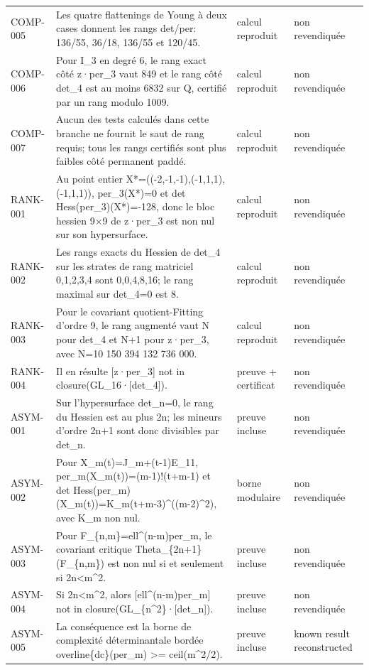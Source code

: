 \begin{longtable}{@{}>{\raggedright\arraybackslash}p{1.6cm}>{\raggedright\arraybackslash}p{8.4cm}>{\raggedright\arraybackslash}p{2.5cm}>{\raggedright\arraybackslash}p{2.0cm}@{}}
COMP-005 & Les quatre flattenings de Young à deux cases donnent les rangs det/per: 136/55, 36/18, 136/55 et 120/45. & calcul reproduit & non revendiquée \\
COMP-006 & Pour I\_3 en degré 6, le rang exact côté z·per\_3 vaut 849 et le rang côté det\_4 est au moins 6832 sur Q, certifié par un rang modulo 1009. & calcul reproduit & non revendiquée \\
COMP-007 & Aucun des tests calculés dans cette branche ne fournit le saut de rang requis; tous les rangs certifiés sont plus faibles côté permanent paddé. & calcul reproduit & non revendiquée \\
RANK-001 & Au point entier X*=((-2,-1,-1),(-1,1,1),(-1,1,1)), per\_3(X*)=0 et det Hess(per\_3)(X*)=-128, donc le bloc hessien 9×9 de z·per\_3 est non nul sur son hypersurface. & calcul reproduit & non revendiquée \\
RANK-002 & Les rangs exacts du Hessien de det\_4 sur les strates de rang matriciel 0,1,2,3,4 sont 0,0,4,8,16; le rang maximal sur det\_4=0 est 8. & calcul reproduit & non revendiquée \\
RANK-003 & Pour le covariant quotient-Fitting d'ordre 9, le rang augmenté vaut N pour det\_4 et N+1 pour z·per\_3, avec N=10 150 394 132 736 000. & calcul reproduit & non revendiquée \\
RANK-004 & Il en résulte [z·per\_3]  not in  closure(GL\_16·[det\_4]). & preuve + certificat & non revendiquée \\
ASYM-001 & Sur l'hypersurface det\_n=0, le rang du Hessien est au plus 2n; les mineurs d'ordre 2n+1 sont donc divisibles par det\_n. & preuve incluse & non revendiquée \\
ASYM-002 & Pour X\_m(t)=J\_m+(t-1)E\_11, per\_m(X\_m(t))=(m-1)!(t+m-1) et det Hess(per\_m)(X\_m(t))=K\_m(t+m-3)\textasciicircum{}((m-2)\textasciicircum{}2), avec K\_m non nul. & borne modulaire & non revendiquée \\
ASYM-003 & Pour F\_\{n,m\}=ell\textasciicircum{}(n-m)per\_m, le covariant critique Theta\_\{2n+1\}(F\_\{n,m\}) est non nul si et seulement si 2n<m\textasciicircum{}2. & preuve incluse & non revendiquée \\
ASYM-004 & Si 2n<m\textasciicircum{}2, alors [ell\textasciicircum{}(n-m)per\_m]  not in  closure(GL\_\{n\textasciicircum{}2\}·[det\_n]). & preuve incluse & non revendiquée \\
ASYM-005 & La conséquence est la borne de complexité déterminantale bordée overline\{dc\}(per\_m) >= ceil(m\textasciicircum{}2/2). & preuve incluse & known result reconstructed \\

\end{longtable}
